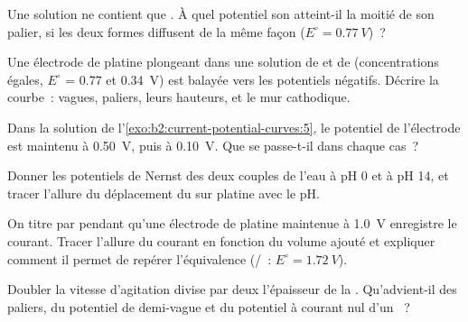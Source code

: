 \begin{exercise}[$\star$]\label{exo:b2:current-potential-curves:4}
Une solution ne contient que . À quel potentiel son 
atteint-il la moitié de son palier, si les deux formes diffusent de la même façon ($E^\circ = \qty{0.77}{V}$)~?
\end{exercise}

\begin{exercise}[$\star\star$]\label{exo:b2:current-potential-curves:5}
Une électrode de platine plongeant dans une solution de  et de  (concentrations
égales, $E^\circ$ = 0.77 et \qty{0.34}{V}) est balayée vers les potentiels
négatifs. Décrire la courbe~: vagues, paliers, leurs hauteurs, et le mur
cathodique.
\end{exercise}

\begin{exercise}[$\star\star$]\label{exo:b2:current-potential-curves:6}
Dans la solution de l'\cref{exo:b2:current-potential-curves:5}, le potentiel de
l'électrode est maintenu à \qty{0.50}{V}, puis à \qty{0.10}{V}. Que se passe-t-il dans
chaque cas~?
\end{exercise}

\begin{exercise}[$\star\star$]\label{exo:b2:current-potential-curves:7}
Donner les potentiels de Nernst des deux couples de l'eau à pH 0 et à pH 14, et
tracer l'allure du déplacement du  sur platine avec le pH.
\end{exercise}

\begin{exercise}[$\star\star$]\label{exo:b2:current-potential-curves:8}
On titre  par  pendant qu'une électrode de platine maintenue à
\qty{1.0}{V} enregistre le courant. Tracer l'allure du courant en fonction du volume ajouté
et expliquer comment il permet de repérer l'équivalence (/~: $E^\circ =
\qty{1.72}{V}$).
\end{exercise}

\begin{exercise}[$\star\star$]\label{exo:b2:current-potential-curves:9}
Doubler la vitesse d'agitation divise par deux l'épaisseur de la . Qu'advient-il
des paliers, du potentiel de demi-vague et du potentiel à courant
nul d'un ~?
\end{exercise}


